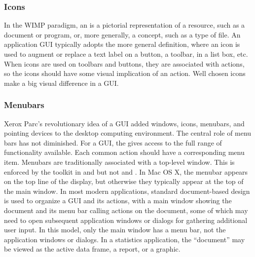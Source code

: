 
\subsubsection{Icons}
\label{sec:GUI:icons}

In the WIMP paradigm, an  is a pictorial representation of a
resource, such as a document or program, or, more generally, a
concept, such as a type of file. An application GUI typically adopts
the more general definition, where an icon is used to augment or
replace a text label on a button, a toolbar, in a list box, etc. When
icons are used on toolbars and buttons, they are associated with
actions, so the icons should have some visual implication of an
action.  Well chosen icons make a big visual difference in a GUI.



\subsubsection{Menubars}
\label{sec:GUI:menubars}

Xerox Parc's revolutionary idea of a  GUI added windows,
icons, menubars, and pointing devices to the desktop computing
environment. The central role of menu bars has not diminished. For a
GUI, the  gives access to the full range of functionality
available. Each common action should have a corresponding menu
item. Menubars are traditionally associated with a top-level
window. This is enforced by the toolkit in \wxWidgets\/ and \Java\/
but not \tcltk\/ and \GTK.  In Mac OS X, the menubar appears on the
top line of the display, but otherwise they typically appear at the
top of the main window. In most modern applications, standard
document-based design is used to organize a GUI and its actions, with
a main window showing the document and its menu bar calling actions on
the document, some of which may need to open subsequent application
windows or dialogs for gathering additional user input.  In this
model, only the main window has a menu bar, not the application
windows or dialogs. In a statistics application, the ``document'' may
be viewed as the active data frame, a report, or a graphic.

